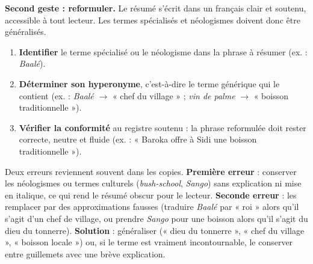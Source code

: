\documentclass[11pt]{article}
\begin{document}
\textbf{Second geste : reformuler.} Le résumé s'écrit dans un français clair et soutenu, accessible à tout lecteur. Les termes spécialisés et néologismes doivent donc être généralisés.

\begin{methode}
\begin{enumerate}
\item \textbf{Identifier} le terme spécialisé ou le néologisme dans la phrase à résumer (ex. : \emph{Baalé}).
\item \textbf{Déterminer son hyperonyme}, c'est-à-dire le terme générique qui le contient (ex. : \emph{Baalé} $\rightarrow$ « chef du village » ; \emph{vin de palme} $\rightarrow$ « boisson traditionnelle »).
\item \textbf{Vérifier la conformité} au registre soutenu : la phrase reformulée doit rester correcte, neutre et fluide (ex. : « Baroka offre à Sidi une boisson traditionnelle »).
\end{enumerate}
\end{methode}

\begin{attention}
Deux erreurs reviennent souvent dans les copies. \textbf{Première erreur} : conserver les néologismes ou termes culturels (\emph{bush-school}, \emph{Sango}) sans explication ni mise en italique, ce qui rend le résumé obscur pour le lecteur. \textbf{Seconde erreur} : les remplacer par des approximations fausses (traduire \emph{Baalé} par « roi » alors qu'il s'agit d'un chef de village, ou prendre \emph{Sango} pour une boisson alors qu'il s'agit du dieu du tonnerre). \textbf{Solution} : généraliser (« dieu du tonnerre », « chef du village », « boisson locale ») ou, si le terme est vraiment incontournable, le conserver entre guillemets avec une brève explication.
\end{attention}
\end{document}
